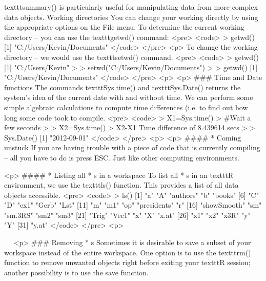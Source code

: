 texttt{summary()} is particularly useful for manipulating data from more complex data objects.
Working directories
You can change your working directly by using the appropriate options on the File menu.
To determine the current working directory – you can use the texttt{getwd()} command:	
<pre>
<code>
> getwd()
[1] "C:/Users/Kevin/Documents"
</code>
</pre>
<p>
To change the working directory – we would use the texttt{setwd()} command.
<pre>
<code>
> getwd()
[1] "C:/Users/Kevin"
>
> setwd("C:/Users/Kevin/Documents")
>
> getwd()
[1] "C:/Users/Kevin/Documents"
</code>
</pre>
<p>
<p>
### {Time and Date functions}
The commands texttt{Sys.time()} and texttt{Sys.Date()} returns the system's idea of the current date with and without time.
We can perform some simple algebraic calculations to compute time differences (i.e. to find out how long some code took to compile.
<pre>
<code>
> X1=Sys.time()
> #Wait a few seconds
>
> X2=Sys.time()
> X2-X1
Time difference of 8.439614 secs
>
> Sys.Date() 
[1] "2012-09-01"
</code>
</pre>
<p>
<p>
####        * {Coming unstuck}
If you are having trouble with a piece of code that is currently compiling – all you have to do is press ESC. Just like other computing environments.

<p>
####        * {Listing all         * s in a workspace}
To list all         * s in an texttt{R} environment, we use the texttt{ls()} function. This provides a list of all data objects  accessible.
<pre>
<code>
> ls()
 [1] "a"          "A"          "authors"    "b"          "books"     
 [6] "C"          "D"          "ex1"        "Gerb"       "Lst"       
[11] "m"          "m1"         "op"         "presidents" "r"         
[16] "showSmooth" "sm"         "sm.3RS"     "sm2"        "sm3"       
[21] "Trig"       "Vec1"       "x"          "X"          "x.at"      
[26] "x1"         "x2"         "x3R"        "y"          "Y"         
[31] "y.at"      
</code>
</pre>
<p>

 
<p>
### {Removing         * s}
Sometimes it is desirable to save a subset of your workspace instead of the entire workspace. One option is to use the texttt{rm()} function to remove unwanted objects right before exiting your texttt{R} session; another possibility is to use the save function. 


